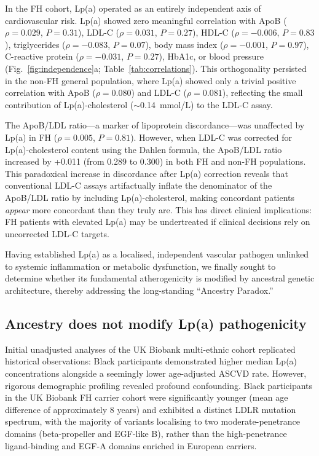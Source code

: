 \documentclass[11pt,a4paper]{article}
\newcommand{\lpa}{Lp(a)}
\newcommand{\ukb}{UK Biobank}
\begin{document}
In the FH cohort, \lpa{} operated as an entirely independent axis of cardiovascular risk. \lpa{} showed zero meaningful correlation with ApoB ($\rho = 0.029$, $P = 0.31$), LDL-C ($\rho = 0.031$, $P = 0.27$), HDL-C ($\rho = -0.006$, $P = 0.83$), triglycerides ($\rho = -0.083$, $P = 0.07$), body mass index ($\rho = -0.001$, $P = 0.97$), C-reactive protein ($\rho = -0.031$, $P = 0.27$), HbA1c, or blood pressure (Fig.~\ref{fig:independence}a; Table~\ref{tab:correlations}). This orthogonality persisted in the non-FH general population, where \lpa{} showed only a trivial positive correlation with ApoB ($\rho = 0.080$) and LDL-C ($\rho = 0.081$), reflecting the small contribution of \lpa{}-cholesterol ($\sim$0.14~mmol/L) to the LDL-C assay.

The ApoB/LDL ratio---a marker of lipoprotein discordance---was unaffected by \lpa{} in FH ($\rho = 0.005$, $P = 0.81$). However, when LDL-C was corrected for \lpa{}-cholesterol content using the Dahlen formula\cite{dahlen1990}, the ApoB/LDL ratio increased by +0.011 (from 0.289 to 0.300) in both FH and non-FH populations. This paradoxical increase in discordance after \lpa{} correction reveals that conventional LDL-C assays artifactually inflate the denominator of the ApoB/LDL ratio by including \lpa{}-cholesterol, making concordant patients \textit{appear} more concordant than they truly are. This has direct clinical implications: FH patients with elevated \lpa{} may be undertreated if clinical decisions rely on uncorrected LDL-C targets\cite{genedy2026}.

Having established \lpa{} as a localised, independent vascular pathogen unlinked to systemic inflammation or metabolic dysfunction, we finally sought to determine whether its fundamental atherogenicity is modified by ancestral genetic architecture, thereby addressing the long-standing ``Ancestry Paradox.''

\subsection*{Ancestry does not modify \lpa{} pathogenicity}

Initial unadjusted analyses of the \ukb{} multi-ethnic cohort replicated historical observations: Black participants demonstrated higher median \lpa{} concentrations alongside a seemingly lower age-adjusted ASCVD rate. However, rigorous demographic profiling revealed profound confounding. Black participants in the \ukb{} FH carrier cohort were significantly younger (mean age difference of approximately 8 years) and exhibited a distinct LDLR mutation spectrum, with the majority of variants localising to two moderate-penetrance domains (beta-propeller and EGF-like B), rather than the high-penetrance ligand-binding and EGF-A domains enriched in European carriers.
\end{document}
